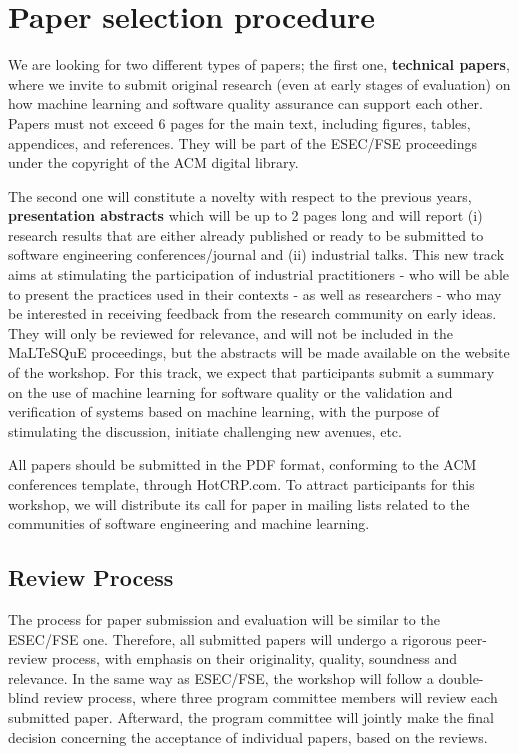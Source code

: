
\section{Paper selection procedure}
\label{sec:submissions}

We are looking for two different types of papers; the first one, \ie \textbf{technical papers}, where we invite to submit original research (even at early stages of evaluation) on how machine learning and software quality assurance can support each other.
Papers must not exceed 6 pages for the main text, including figures, tables, appendices, and references.
They will be part of the ESEC/FSE proceedings under the copyright of the ACM digital library.

The second one will constitute a novelty with respect to the previous years, \ie \textbf{presentation abstracts} which will be up to 2 pages long and will report (i) research results that are either already published or ready to be submitted to software engineering conferences/journal and (ii) industrial talks. This new track aims at stimulating the participation of industrial practitioners - who will be able to present the practices used in their contexts - as well as researchers - who may be interested in receiving feedback from the research community on early ideas. They will only be reviewed for relevance, and will not be included in the MaLTeSQuE proceedings, but the abstracts will be made available on the website of the workshop.
For this track, we expect that participants submit a summary on the use of machine learning for software quality or the validation and verification of systems based on machine learning, with the purpose of stimulating the discussion, initiate challenging new avenues, etc.

All papers should be submitted in the PDF format, conforming to the ACM conferences template, through HotCRP.com.
To attract participants for this workshop, we will distribute its call for paper in mailing lists related to the communities of software engineering and machine learning.

\subsection{Review Process}

The process for paper submission and evaluation will be similar to the ESEC/FSE one.
Therefore, all submitted papers will undergo a rigorous peer-review process, with emphasis on their originality, quality, soundness and relevance.
In the same way as ESEC/FSE, the workshop will follow a double-blind review process, where three program committee members will review each submitted paper.
Afterward, the program committee will jointly make the final decision concerning the acceptance of individual papers, based on the reviews.

